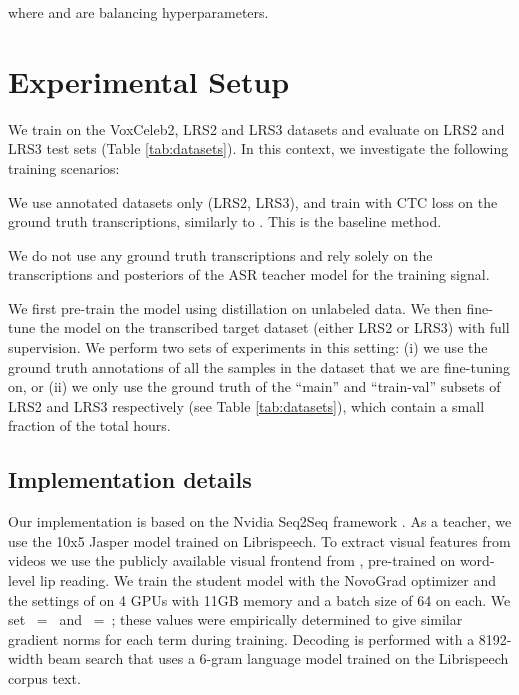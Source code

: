 \documentclass{article}
\def\newpara{\vspace{1pt}}
\def\psec{\vspace{-4pt}}
\begin{document}
where  and  are balancing hyperparameters.

\psec\psec
\section{Experimental Setup} \label{sec:exp_setup} 
\psec


We train on the VoxCeleb2, LRS2 and LRS3 datasets and evaluate on LRS2 and LRS3 test sets (Table \ref{tab:datasets}).
In this context, we investigate the following training scenarios:

\newpara{}
We use annotated datasets only (LRS2, LRS3), and train with CTC loss on
the ground truth transcriptions, similarly to \cite{Assael16,Afouras18b}.
This is the baseline method. 

\newpara{}
We do not use any ground truth transcriptions and rely solely on the transcriptions and posteriors of the
ASR teacher model for the training signal.

\newpara{}
We first pre-train the model using distillation on unlabeled data.
We then fine-tune the model on the transcribed target dataset (either LRS2 or LRS3) with full supervision.
We perform two sets of experiments in this setting:
(i) we use the ground truth annotations of all the samples in the dataset that we are fine-tuning on, or 
(ii) we only use the ground truth of the ``main'' and ``train-val'' subsets of LRS2 and LRS3
respectively (see Table \ref{tab:datasets}), which contain a small fraction of the total hours.






\psec
\psec
\psec
\subsection{Implementation details}
\psec
Our implementation is based on the Nvidia Seq2Seq framework \cite{openseq2seq}.
As a teacher, we use the 10x5 Jasper model trained on Librispeech.
To extract visual features from videos we use the publicly available visual
frontend from \cite{Afouras18b}, pre-trained on word-level lip reading.
We train the student model with the NovoGrad optimizer and
the settings of \cite{li2019jasper} on 4 GPUs with 11GB memory and a batch size of 64 on each.
We set ~=~ and ~=~; these values were empirically determined to give similar gradient norms for each term during training.
Decoding is performed with a 8192-width beam search that uses a 6-gram language model trained on the
Librispeech corpus text.
\end{document}

